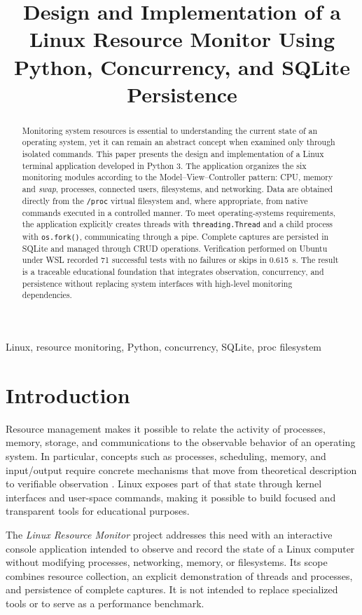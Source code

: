 \documentclass[conference]{IEEEtran}
\title{Design and Implementation of a Linux Resource Monitor Using Python, Concurrency, and SQLite Persistence}
\author{
\IEEEauthorblockN{Julio Cesar Blacio Machuca \qquad Ariel Jose Llumiquinga \~Nacato}
\IEEEauthorblockA{Carrera de Ingenier\'ia de Software\\
Universidad de las Fuerzas Armadas ESPE\\
Sangolqu\'i, Ecuador}
}
\begin{document}
\maketitle

\begin{abstract}
Monitoring system resources is essential to understanding the current state of an operating system, yet it can remain an abstract concept when examined only through isolated commands. This paper presents the design and implementation of a Linux terminal application developed in Python 3. The application organizes the six monitoring modules according to the Model--View--Controller pattern: CPU, memory and \textit{swap}, processes, connected users, filesystems, and networking. Data are obtained directly from the \texttt{/proc} virtual filesystem and, where appropriate, from native commands executed in a controlled manner. To meet operating-systems requirements, the application explicitly creates threads with \texttt{threading.Thread} and a child process with \texttt{os.fork()}, communicating through a pipe. Complete captures are persisted in SQLite and managed through CRUD operations. Verification performed on Ubuntu under WSL recorded 71 successful tests with no failures or skips in 0.615~s. The result is a traceable educational foundation that integrates observation, concurrency, and persistence without replacing system interfaces with high-level monitoring dependencies.
\end{abstract}

\begin{IEEEkeywords}
Linux, resource monitoring, Python, concurrency, SQLite, proc filesystem
\end{IEEEkeywords}

\section{Introduction}
Resource management makes it possible to relate the activity of processes, memory, storage, and communications to the observable behavior of an operating system. In particular, concepts such as processes, scheduling, memory, and input/output require concrete mechanisms that move from theoretical description to verifiable observation \cite{silberschatz2019}. Linux exposes part of that state through kernel interfaces and user-space commands, making it possible to build focused and transparent tools for educational purposes.

The \textit{Linux Resource Monitor} project addresses this need with an interactive console application intended to observe and record the state of a Linux computer without modifying processes, networking, memory, or filesystems. Its scope combines resource collection, an explicit demonstration of threads and processes, and persistence of complete captures. It is not intended to replace specialized tools or to serve as a performance benchmark.
\end{document}
